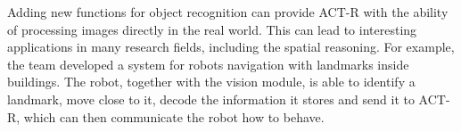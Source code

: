 	Adding new functions for object recognition can provide \mbox{ACT-R} with the ability of processing images directly in the real world. 
	This can lead to interesting applications in many research fields, including the spatial reasoning. 
	For example, the team developed a system for robots navigation with landmarks inside buildings. 
	The robot, together with the vision module, is able to identify a landmark, move close to it, decode the information it stores and send it to \mbox{ACT-R}, which can then communicate the robot how to behave.


 




\begin{comment}	
	aggiungere:
		riconoscimento ellissi
		riconoscimento testo

		introdurre il flusso video --> predisposto
	
		migliorare le performance dell'algoritmo in modo tale che la shape detection sia utilizzata in tempo reale pnell'ambito della navigazione con robot.
\end{comment}	
